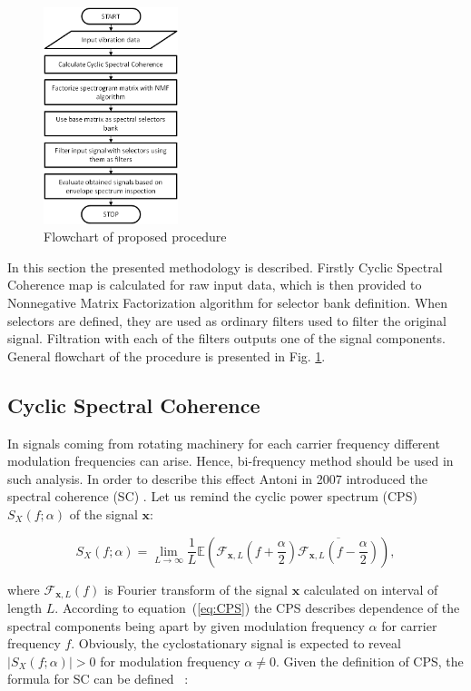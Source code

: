 \documentclass[10pt]{article}
\begin{document}
\begin{figure}[h!]
\centering
\includegraphics[width=0.35\textwidth]{wykresy/block}
\caption{Flowchart of proposed procedure}
\label{fig:block}
\end{figure}

In this section the presented methodology is described. Firstly Cyclic Spectral Coherence map is calculated for raw input data, which is then provided to Nonnegative Matrix Factorization algorithm for selector bank definition. When selectors are defined, they are used as ordinary filters used to filter the original signal. Filtration with each of the filters outputs one of the signal components. General flowchart of the procedure is presented in Fig. \ref{fig:block}.

\subsection{Cyclic Spectral Coherence}

In signals coming from rotating machinery for each carrier frequency different modulation frequencies can arise. Hence, bi-frequency method should be used in such analysis. In order to describe this effect Antoni in 2007 introduced the spectral coherence (SC) \cite{antoni2007cyclic}. Let us remind the cyclic power spectrum (CPS) $S_X(f;\alpha)$ of the signal $\mathbf{x}$:

\begin{equation}
\label{eq:CPS}
S_X(f;\alpha)=\lim_{L\to \infty} \frac{1}{L}\mathbb{E} \left(\mathcal{F}_{\mathbf{x},L} (f+\frac{\alpha}{2})\overline{\mathcal{F}_{\mathbf{x},L}(f-\frac{\alpha}{2})}\right),
\end{equation}

where $\mathcal{F}_{\mathbf{x},L}(f)$ is Fourier transform of the signal $\mathbf{x}$ calculated on interval of length $L$. According to equation~(\ref{eq:CPS}) the CPS describes dependence of the spectral components being apart by given modulation frequency $\alpha$ for carrier frequency $f$. Obviously, the cyclostationary signal is expected to reveal $\left|S_X(f;\alpha)\right|>0$ for modulation frequency $\alpha\neq 0$. Given the definition of CPS, the formula for SC can be defined ~\cite{antoni2007cyclic}:
\end{document}
